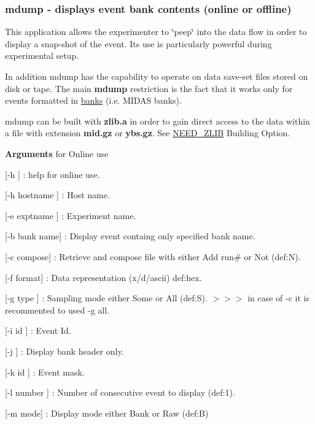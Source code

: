 \label{RC_Monitor_idx_mdump-utility}
\hypertarget{RC_Monitor_idx_mdump-utility}{}
 \hypertarget{RC_Monitor_RC_mdump_utility}{}\subsubsection{mdump       -\/ displays event bank contents (online or offline)}\label{RC_Monitor_RC_mdump_utility}
This application allows the experimenter to \char`\"{}peep\char`\"{} into the data flow in order to display a snap-\/shot of the event. Its use is particularly powerful during experimental setup. \par
In addition mdump has the capability to operate on data save-\/set files stored on disk or tape. The main {\bfseries mdump} restriction is the fact that it works only for events formatted in \hyperlink{FE_bank_construction}{banks} (i.e. MIDAS banks).

mdump can be built with {\bfseries zlib.a} in order to gain direct access to the data within a file with extension {\bfseries mid.gz} or {\bfseries ybs.gz}. See \hyperlink{BuildingOptions_BO_NEED_ZLIB}{NEED\_\-ZLIB} Building Option.


\begin{DoxyItemize}
\item {\bfseries  Arguments } for Online use
\begin{DoxyItemize}
\item \mbox{[}-\/h \mbox{]} : help for online use.
\item \mbox{[}-\/h hostname \mbox{]} : Host name.
\item \mbox{[}-\/e exptname \mbox{]} : Experiment name.
\item \mbox{[}-\/b bank name\mbox{]} : Display event containg only specified bank name.
\item \mbox{[}-\/c compose\mbox{]} : Retrieve and compose file with either Add run\# or Not (def:N).
\item \mbox{[}-\/f format\mbox{]} : Data representation (x/d/ascii) def:hex.
\item \mbox{[}-\/g type \mbox{]} : Sampling mode either Some or All (def:S). $>$$>$$>$ in case of -\/c it is recommented to used -\/g all.
\item \mbox{[}-\/i id \mbox{]} : Event Id.
\item \mbox{[}-\/j \mbox{]} : Display bank header only.
\item \mbox{[}-\/k id \mbox{]} : Event mask.
\item \mbox{[}-\/l number \mbox{]} : Number of consecutive event to display (def:1).
\item \mbox{[}-\/m mode\mbox{]} : Display mode either Bank or Raw (def:B)
\end{DoxyItemize}
\end{DoxyItemize}


